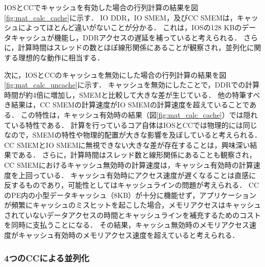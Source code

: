 \documentclass[submit,techrep]{ipsj_v2/UTF8/ipsj}
\begin{document}
IOSとCCでキャッシュを有効した場合の行列計算の結果を図\ref{fig:mat_calc_cache}に示す．
IO DDR，IO SMEM，及びCC SMEMは，キャッシュによってほとんど違いがないことが分かる．
これは，IOSの128 KBのデータキャッシュが機能し，DDRアクセスの遅延を補っていると考えられる．
さらに，計算時間はスレッドの数とほぼ線形関係にあることが観察され，並列化に関する理想的な動作に相当する．

次に，IOSとCCのキャッシュを無効にした場合の行列計算の結果を図\ref{fig:mat_calc_uncache}に示す．
キャッシュを無効にしたことで，DDRでの計算時間が約4倍に増加し，SMEMと比較して大きな差が生じている．
他の特筆すべき結果は，CC SMEMの計算速度がIO SMEMの計算速度を超えていることである．
この特性は，キャッシュ有効時の結果（図\ref{fig:mat_calc_cache}）では隠れている特性である．
計算を行っているコア自体はIOSとCCでは物理的には同じなので，SMEMの特性や物理的配置が大きな影響を及ぼしていると考えられる．
CC SMEMとIO SMEMに無視できない大きな差が存在することは，興味深い結果である．
さらに，計算時間はスレッド数と線形関係にあることも観察され，CC SMEMにおけるキャッシュ無効時の計算速度は，キャッシュ有効時の計算速度を上回っている．
キャッシュ有効時にアクセス速度が遅くなることは直感に反するものであり，可能性としてはキャッシュラインの問題が考えられる．
CCのPE内の小型データキャッシュ（8KB）が十分に機能せず，アプリケーションが頻繁にキャッシュのミスヒットを起こした場合，メモリアクセスはキャッシュされていないデータアクセスの時間とキャッシュラインを補充するためのコストを同時に支払うことになる．
その結果，キャッシュ無効時のメモリアクセス速度がキャッシュ有効時のメモリアクセス速度を超えていると考えられる．

\subsubsection{4つのCCによる並列化}
\label{sec:four_CCs}
\end{document}
